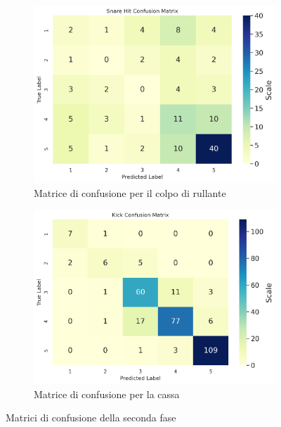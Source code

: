 \begin{figure}[h!]
	\begin{subfigure}{.5\linewidth}
		\includegraphics[width=\linewidth]{./immagini/second_classification/sn_hit_cm.png}
		\caption{Matrice di confusione per il colpo di rullante}
		\label{fig:cm_2c}
	\end{subfigure}\hfill
	\begin{subfigure}{.5\linewidth}
		\includegraphics[width=\linewidth]{./immagini/second_classification/kick_cm.png}
		\caption{Matrice di confusione per la cassa}
		\label{fig:cm_2d}
	\end{subfigure}
	\caption{Matrici di confusione della seconda fase}
	\label{fig:cm_2}
\end{figure}

